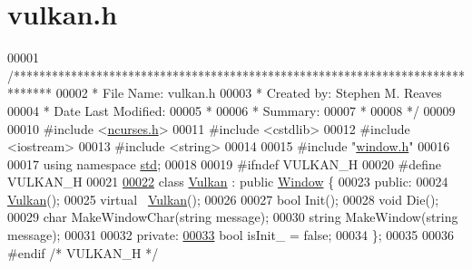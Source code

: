\hypertarget{vulkan_8h_source}{}\section{vulkan.\+h}

\begin{DoxyCode}
00001 \textcolor{comment}{/******************************************************************************}
00002 \textcolor{comment}{ * File Name: vulkan.h}
00003 \textcolor{comment}{ * Created by: Stephen M. Reaves}
00004 \textcolor{comment}{ * Date Last Modified:}
00005 \textcolor{comment}{ *}
00006 \textcolor{comment}{ * Summary:}
00007 \textcolor{comment}{ *}
00008 \textcolor{comment}{ */}
00009 
00010 \textcolor{preprocessor}{#include <\mbox{\hyperlink{ncurses_8h}{ncurses.h}}>}
00011 \textcolor{preprocessor}{#include <cstdlib>}
00012 \textcolor{preprocessor}{#include <iostream>}
00013 \textcolor{preprocessor}{#include <string>}
00014 
00015 \textcolor{preprocessor}{#include "\mbox{\hyperlink{window_8h}{window.h}}"}
00016 
00017 \textcolor{keyword}{using namespace }\mbox{\hyperlink{namespacestd}{std}};
00018 
00019 \textcolor{preprocessor}{#ifndef VULKAN\_H}
00020 \textcolor{preprocessor}{#define VULKAN\_H}
00021 
\mbox{\hyperlink{classVulkan}{00022}} \textcolor{keyword}{class }\mbox{\hyperlink{classVulkan}{Vulkan}} : \textcolor{keyword}{public} \mbox{\hyperlink{classWindow}{Window}} \{
00023  \textcolor{keyword}{public}:
00024   \mbox{\hyperlink{classVulkan}{Vulkan}}();
00025   \textcolor{keyword}{virtual} ~\mbox{\hyperlink{classVulkan}{Vulkan}}();
00026 
00027   \textcolor{keywordtype}{bool} Init();
00028   \textcolor{keywordtype}{void} Die();
00029   \textcolor{keywordtype}{char} MakeWindowChar(\textcolor{keywordtype}{string} message);
00030   \textcolor{keywordtype}{string} MakeWindow(\textcolor{keywordtype}{string} message);
00031 
00032  \textcolor{keyword}{private}:
\mbox{\hyperlink{classVulkan_aa19833e837744cc2f6b1f93c1d66a693}{00033}}   \textcolor{keywordtype}{bool} isInit\_ = \textcolor{keyword}{false};
00034 \};
00035 
00036 \textcolor{preprocessor}{#endif }\textcolor{comment}{/* VULKAN\_H */}\textcolor{preprocessor}{}
\end{DoxyCode}
